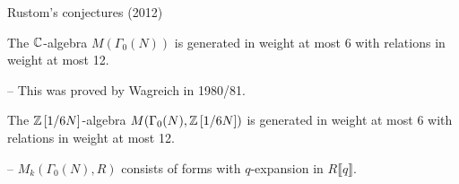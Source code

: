 \begin{frame}{Rustom's conjectures (2012)}


  \begin{conjecture}[Rustom]
The $\mathbb{C}$-algebra $M(\Gamma_0(N))$ is generated in weight at most 6 with relations in weight at most 12.    
  \end{conjecture}

-- This was proved by Wagreich in 1980/81.

\vspace{6pt}

  \begin{conjecture}[Rustom]
The $\mathbb{Z}\left[1/6N\right]$-algebra $M(\Gamma_0(N), \mathbb{Z}\left[1/6N\right])$ is generated in weight at most 6 with relations in weight at most 12.    
  \end{conjecture}

-- $M_k(\Gamma_0(N),R)$ consists of forms with $q$-expansion in $R\llbracket q\rrbracket$.







\end{frame}
